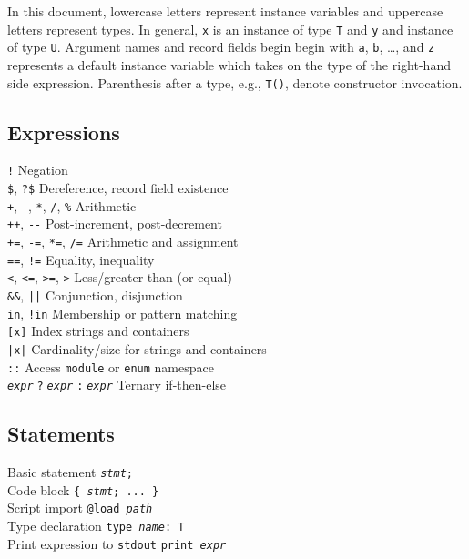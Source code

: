 \documentclass[10pt,landscape]{article}
\newcommand{\minisec}[1]{\textbf{#1}\\}
\begin{document}
\begin{multicols*}{3}
In this document, lowercase letters represent instance variables and uppercase
letters represent types. In general, \texttt{x} is an instance of type
\texttt{T} and \texttt{y} and instance of type \texttt{U}. Argument names and
record fields begin begin with \texttt{a}, \texttt{b}, \ldots, and \texttt{z}
represents a default instance variable which takes on the type of the
right-hand side expression. Parenthesis after a type, e.g., \texttt{T()},
denote constructor invocation.

\subsection*{Expressions}

\verb|!| \dotfill Negation\\
\verb|$|, \verb|?$| \dotfill Dereference, record field existence\\
\verb|+|, \verb|-|, \verb|*|, \verb|/|, \verb|%| \dotfill Arithmetic\\
\verb|++|, \verb|--| \dotfill Post-increment, post-decrement\\
\verb|+=|, \verb|-=|, \verb|*=|, \verb|/=| \dotfill Arithmetic and assignment\\
\verb|==|, \verb|!=| \dotfill Equality, inequality\\
\verb|<|, \verb|<=|, \verb|>=|, \verb|>|
  \dotfill Less/greater than (or equal)\\
\verb|&&|, \verb#||# \dotfill Conjunction, disjunction\\
\verb|in|, \verb|!in| \dotfill Membership or pattern matching\\
\verb|[x]| \dotfill Index strings and containers\\
\verb#|x|# \dotfill Cardinality/size for strings and containers\\
\verb|::| \dotfill Access \texttt{module} or \texttt{enum} namespace\\
\texttt{\textit{expr}$\;$?$\;$\textit{expr}$\;$:$\;$\textit{expr}}
  \dotfill Ternary if-then-else

\subsection*{Statements}

Basic statement \dotfill \texttt{\textit{stmt};}\\ 
Code block \dotfill \texttt{\{ \textit{stmt}; ... \}}\\ 
Script import \dotfill \texttt{@load \textit{path}}\\
Type declaration \dotfill \texttt{type~\textit{name}:~T}\\
Print expression to \texttt{stdout} \dotfill
\texttt{print \textit{expr}}\\


\end{multicols*}
\end{document}
